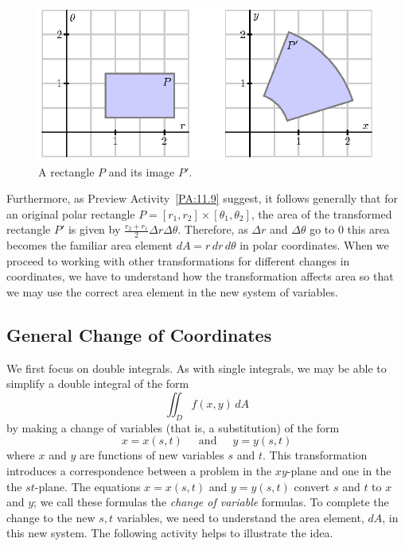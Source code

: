 \begin{figure}[ht]
\begin{center}
  \includegraphics{figures/fig_11_9_polar_change.eps}
\end{center}
  \caption{A rectangle $P$ and its image $P'$.}
\label{F:11.9.Change_vars1_a}
\end{figure}
Furthermore, as Preview Activity~\ref{PA:11.9} suggest, it follows generally that for an original polar rectangle $P = [r_1, r_2] \times [\theta_1, \theta_2]$, the area of the transformed rectangle $P'$ is given by $\frac{r_2+r_1}{2} \Delta r \Delta \theta$.  Therefore, as $\Delta r$ and $\Delta \theta$ go to 0 this area becomes the familiar area element $dA = r \, dr \, d\theta$ in polar coordinates.  When we proceed to working with other transformations for different changes in coordinates, we have to understand how the transformation affects area so that we may use the correct area element in the new system of variables.

\subsection*{General Change of Coordinates}

We first focus on double integrals.  As with single integrals, we may be able to simplify a double integral of the form
\[\iint_D f(x,y) \, dA\]
by making a change of variables (that is, a substitution) of the form
\[x = x(s, t) \ \ \ \ \ \text{ and } \ \ \ \ \  y = y(s, t)\]
where $x$ and $y$ are functions of new variables $s$ and $t$. This transformation introduces a correspondence between a problem in the $xy$-plane and one in the the $st$-plane. The equations $x=x(s,t)$ and $y=y(s,t)$ convert $s$ and $t$ to $x$ and $y$; we call these formulas the \emph{change of variable} formulas. To complete the change to the new $s,t$ variables, we need to understand the area element, $dA$, in this new system.  The following activity helps to illustrate the idea.

